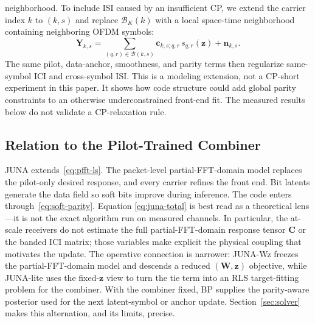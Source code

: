 \documentclass[journal]{IEEEtran}
\newcommand{\juna}{JUNA}
\newcommand{\junalite}{JUNA-lite}
\newcommand{\junawz}{JUNA-Wz}
\begin{document}
neighborhood. To include ISI caused by an insufficient CP, we extend the
carrier index $k$ to $(k,s)$ and replace $\mathcal B_K(k)$ with a local
space-time neighborhood containing neighboring OFDM symbols:
\begin{equation}
  \mathbf Y_{k,s}
  =\sum_{(q,r)\in\mathcal B(k,s)}
      \mathbf c_{k,s;q,r}\,s_{q,r}(\mathbf z)+\mathbf n_{k,s}.
  \label{eq:space-time-coupling}
\end{equation}
The same pilot, data-anchor, smoothness, and parity terms then regularize
same-symbol ICI and cross-symbol ISI. This is a
modeling extension, not a CP-short experiment in this paper. It shows how code
structure could add global parity constraints to an otherwise underconstrained
front-end fit. The measured results below do not validate a CP-relaxation rule.

\subsection{Relation to the Pilot-Trained Combiner}\label{ssec:juna-relation}
\juna{} extends~\eqref{eq:pfft-ls}. The packet-level partial-FFT-domain model
replaces the pilot-only desired response, and every carrier refines the front
end. Bit latents generate the data field so soft bits improve during inference.
The code enters through~\eqref{eq:soft-parity}. Equation
\eqref{eq:juna-total} is best read as a theoretical lens---it is not the exact
algorithm run on measured channels. In particular, the at-scale receivers do not
estimate the full partial-FFT-domain response tensor $\mathbf C$ or the banded ICI matrix;
those variables make explicit the physical coupling that motivates the update.
The operative connection is narrower: \junawz{} freezes the partial-FFT-domain model and
descends a reduced $(\mathbf W,\mathbf z)$ objective, while \junalite{} uses the
fixed-$\mathbf z$ view to turn the tie term into an RLS target-fitting problem
for the combiner. With the combiner fixed, BP supplies the parity-aware
posterior used for the next latent-symbol or anchor update.
Section~\ref{sec:solver} makes this alternation, and its limits, precise.

\end{document}
